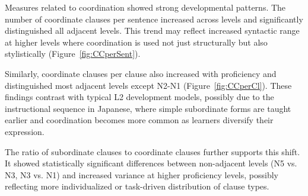 
Measures related to coordination showed strong developmental patterns. The number of coordinate clauses per sentence
increased across levels and significantly
distinguished all adjacent levels. This trend may reflect increased syntactic range at higher levels where
coordination is used not just structurally but also stylistically (Figure~\ref{fig:CCperSent}).

Similarly, coordinate clauses per clause also increased with proficiency and distinguished most adjacent levels
except N2-N1 (Figure~\ref{fig:CCperCl}). These findings contrast with typical L2 development models, possibly due
to the instructional sequence in Japanese, where simple subordinate forms are taught earlier and coordination
becomes more common as learners diversify their expression.

The ratio of subordinate clauses to
coordinate clauses further supports this shift. It showed statistically significant differences between non-adjacent
levels (N5 vs. N3, N3 vs. N1) and increased variance at higher proficiency levels, possibly reflecting more
individualized or task-driven distribution of clause types.

